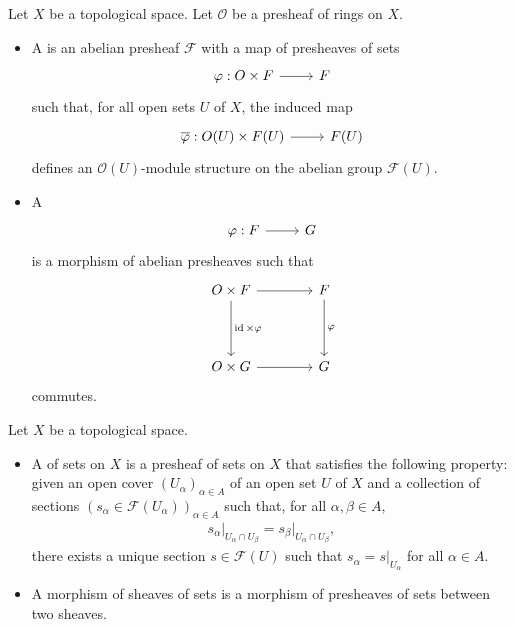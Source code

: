 \documentclass [11 pt, oneside] {article}
\begin{document}
\begin{definition}\label{}\text{}
Let $X$ be a topological space. Let $\mathscr{O}$ be a presheaf of rings on $X$.
\begin{itemize}
	\item A  is an abelian presheaf $\mathscr{F}$ with a map of presheaves of sets
		\[
		\begin{tikzcd}
			\varphi : \mathscr{O}\times \mathscr{F}\ar[r] & \mathscr{F}
		\end{tikzcd}
		\]
		such that, for all open sets $U$ of $X$, the induced map
		\[
		\begin{tikzcd}
			\overline{\varphi} : \mathscr{O}(U)\times  \mathscr{F}(U)\ar[r]&  \mathscr{F}(U)
		\end{tikzcd}
		\]
		defines an $\mathscr{O}(U)$-module structure on the abelian group $\mathscr{F}(U)$.

	\item A  
		\[
		\begin{tikzcd}
			\varphi :\mathscr{F}\ar[r]& \mathscr{G}
		\end{tikzcd}
		\]
		is a morphism of abelian presheaves such that 
		\[
		\begin{tikzcd}[sep = 4 em]
			\mathscr{O}\times \mathscr{F}\ar[r]\ar[d,"\id\times \varphi"] &\mathscr{F}\ar[d,"\varphi"]\\
			\mathscr{O}\times \mathscr{G}\ar[r] & \mathscr{G}
		\end{tikzcd}
		\]
		commutes.

\end{itemize}
\end{definition}

\begin{definition}\label{}\text{}
Let $X$ be a topological space.
\begin{itemize}
	\item A  of sets on $X$ is a presheaf of sets on $X$ that satisfies the following property: given an open cover $(U_{\alpha}) _{\alpha\in A}$ of an open set $U$ of $X$ and a collection of sections $(s_{\alpha}\in \mathscr{F}(U_{\alpha}))_{\alpha\in A} $ such that, for all $\alpha,\beta\in A$,
		\begin{align*}
			s_{\alpha}\big|_{U_{\alpha}\cap U_{\beta}} = s_{\beta}\big|_{U_{\alpha}\cap U_{\beta}},
		\end{align*}
		there exists a unique section $s\in \mathscr{F}(U)$ such that $s_{\alpha} = s\big|_{U_{\alpha}}$ for all $\alpha\in A$.
	\item A morphism of sheaves of sets is a morphism of presheaves of sets between two sheaves.
\end{itemize}
\end{definition}
\end{document}
